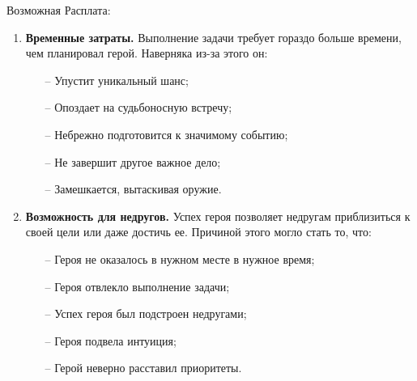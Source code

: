 Возможная Расплата:
\begin{enumerate}
\item \textbf{Временные затраты.} Выполнение задачи требует гораздо больше времени, чем планировал герой. Наверняка из-за этого он:
\begin{itemize}
    \item[--] Упустит уникальный шанс;
    \item[--] Опоздает на судьбоносную встречу;
    \item[--] Небрежно подготовится к значимому событию;
    \item[--] Не завершит другое важное дело;
    \item[--] Замешкается, вытаскивая оружие.
\end{itemize}

\item \textbf{Возможность для недругов.} Успех героя позволяет недругам приблизиться к своей цели или даже достичь ее. Причиной этого могло стать то, что:
\begin{itemize}
    \item[--] Героя не оказалось в нужном месте в нужное время;
    \item[--] Героя отвлекло выполнение задачи;
    \item[--] Успех героя был подстроен недругами;
    \item[--] Героя подвела интуиция;
    \item[--] Герой неверно расставил приоритеты.
\end{itemize}


\end{enumerate}
